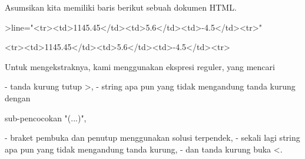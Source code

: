\documentclass[a4paper,10pt]{article}
\begin{document}
\begin{eulernotebook}
\begin{eulercomment}
\begin{eulercomment}
\begin{eulercomment}
\begin{eulercomment}
\begin{eulercomment}
\begin{eulercomment}
\begin{eulercomment}
\begin{eulercomment}
\begin{eulercomment}
Asumsikan kita memiliki baris berikut sebuah dokumen HTML.
\end{eulercomment}
\begin{eulerprompt}
>line="<tr><td>1145.45</td><td>5.6</td><td>-4.5</td><tr>"
\end{eulerprompt}
\begin{euleroutput}
  <tr><td>1145.45</td><td>5.6</td><td>-4.5</td><tr>
\end{euleroutput}
\begin{eulercomment}
Untuk mengekstraknya, kami menggunakan ekspresi reguler, yang mencari

\end{eulercomment}
\begin{eulerttcomment}
  - tanda kurung tutup >,
  - string apa pun yang tidak mengandung tanda kurung dengan
\end{eulerttcomment}
\begin{eulercomment}
sub-pencocokan "(...)",\\
\end{eulercomment}
\begin{eulerttcomment}
  - braket pembuka dan penutup menggunakan solusi terpendek,
  - sekali lagi string apa pun yang tidak mengandung tanda kurung,
  - dan tanda kurung buka <.
\end{eulerttcomment}
\begin{eulercomment}


\end{eulercomment}
\end{eulercomment}
\end{eulercomment}
\end{eulercomment}
\end{eulercomment}
\end{eulercomment}
\end{eulercomment}
\end{eulercomment}
\end{eulercomment}
\end{eulernotebook}
\end{document}
